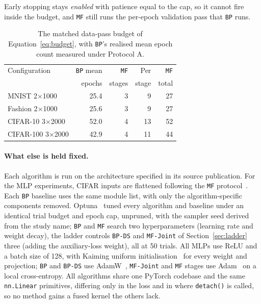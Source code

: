 \documentclass{llncs}
\newcommand{\MF}{\texttt{MF}}
\newcommand{\BP}{\texttt{BP}}
\newcommand{\BPDS}{\texttt{BP-DS}}
\newcommand{\MFJ}{\texttt{MF-Joint}}
\begin{document}
Early stopping stays
\emph{enabled} with patience equal to the cap, so it cannot fire inside the
budget, and \MF{} still runs the per-epoch validation pass that \BP{} runs.

\begin{table}[tb]
  \centering
  \caption{The matched data-pass budget of Equation~\ref{eq:budget}, with
    \BP{}'s realised mean epoch count measured under Protocol A.}
  \label{tab:budget}
  \setlength{\tabcolsep}{8pt}
  \footnotesize
  \begin{tabular}{lrrrr}
    \toprule
    Configuration & \BP{} mean & \MF{} & Per & \MF{} \\
                  & epochs     & stages & stage & total \\
    \midrule
    MNIST 2$\times$1000     & 25.4 & 3 &  9 & 27 \\
    Fashion 2$\times$1000   & 25.6 & 3 &  9 & 27 \\
    CIFAR-10 3$\times$2000  & 52.0 & 4 & 13 & 52 \\
    CIFAR-100 3$\times$2000 & 42.9 & 4 & 11 & 44 \\
    \bottomrule
  \end{tabular}
\end{table}

\paragraph{What else is held fixed.}
Each algorithm is run on the architecture specified in its source publication.
For the MLP experiments, CIFAR inputs are flattened following the \MF{}
protocol~\cite{gong2025mono}. Each \BP{} baseline uses the same module list,
with only the algorithm-specific components removed.
Optuna~\cite{akiba2019optuna} tuned every algorithm and baseline under an
identical trial budget and epoch cap, unpruned, with the sampler seed derived
from the study name; \BP{} and \MF{} search two hyperparameters (learning rate and
weight decay), the ladder controls \BPDS{} and \MFJ{} of Section~\ref{sec:ladder} three (adding the auxiliary-loss weight), all
at \num{50} trials. All MLPs use ReLU and a batch size of \num{128}, with Kaiming
uniform initialisation~\cite{he2015delving} for every weight and projection;
\BP{} and \BPDS{} use AdamW~\cite{loshchilov2019decoupled}, \MFJ{} and \MF{}
stages use Adam~\cite{kingma2015adam} on a local cross-entropy. All algorithms share one PyTorch codebase and the
same \texttt{nn.Linear} primitives, differing only in the loss and in where
\texttt{detach()} is called, so no method gains a fused kernel the others lack.
\end{document}
